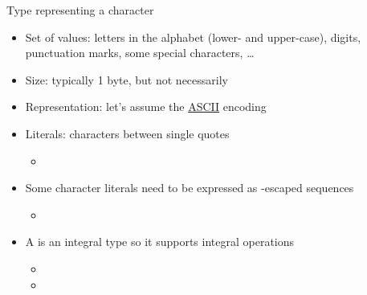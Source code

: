 \begin{frame}[fragile]{}

  Type representing a character

  \begin{itemize}[<+->]
  \item Set of values: letters in the alphabet (lower- and upper-case), digits,
    punctuation marks, some special characters, \ldots
  \item Size: typically 1 byte, but not necessarily
  \item Representation: let's assume the
    \href{https://en.wikipedia.org/wiki/ASCII}{ASCII} encoding
  \item Literals: characters between single quotes
    \begin{itemize}[<.->]
    \item {}
    \end{itemize}
  \item Some character literals need to be expressed as \code{\bslash}-escaped
    sequences
    \begin{itemize}[<.->]
    \item {}
    \end{itemize}
  \item A  is an integral type so it supports integral operations
    \begin{itemize}
    \item {}
    \item {}
    \end{itemize}
  \end{itemize}

\end{frame}

